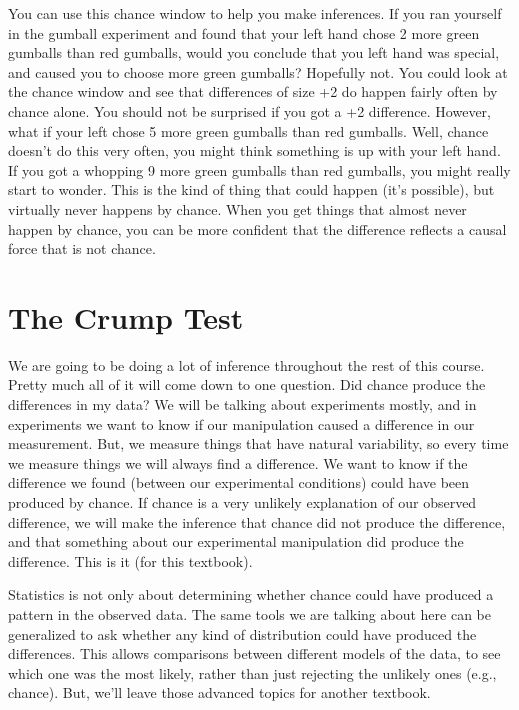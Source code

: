 \documentclass[
]{book}
\begin{document}
You can use this chance window to help you make inferences. If you ran yourself in the gumball experiment and found that your left hand chose 2 more green gumballs than red gumballs, would you conclude that you left hand was special, and caused you to choose more green gumballs? Hopefully not. You could look at the chance window and see that differences of size +2 do happen fairly often by chance alone. You should not be surprised if you got a +2 difference. However, what if your left chose 5 more green gumballs than red gumballs. Well, chance doesn't do this very often, you might think something is up with your left hand. If you got a whopping 9 more green gumballs than red gumballs, you might really start to wonder. This is the kind of thing that could happen (it's possible), but virtually never happens by chance. When you get things that almost never happen by chance, you can be more confident that the difference reflects a causal force that is not chance.

\hypertarget{the-crump-test}{%
\section{The Crump Test}\label{the-crump-test}}

We are going to be doing a lot of inference throughout the rest of this course. Pretty much all of it will come down to one question. Did chance produce the differences in my data? We will be talking about experiments mostly, and in experiments we want to know if our manipulation caused a difference in our measurement. But, we measure things that have natural variability, so every time we measure things we will always find a difference. We want to know if the difference we found (between our experimental conditions) could have been produced by chance. If chance is a very unlikely explanation of our observed difference, we will make the inference that chance did not produce the difference, and that something about our experimental manipulation did produce the difference. This is it (for this textbook).

\begin{marginnote}

Statistics is not only about determining whether chance could have produced a pattern in the observed data. The same tools we are talking about here can be generalized to ask whether any kind of distribution could have produced the differences. This allows comparisons between different models of the data, to see which one was the most likely, rather than just rejecting the unlikely ones (e.g., chance). But, we'll leave those advanced topics for another textbook.

\end{marginnote}
\end{document}
